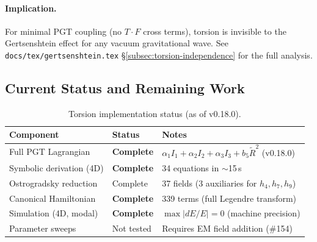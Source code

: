 \paragraph{Implication.}
For minimal PGT coupling (no $T{\cdot}F$ cross terms), torsion is invisible to
the Gertsenshtein effect for any vacuum gravitational wave.  See
\texttt{docs/tex/gertsenshtein.tex} \S\ref{subsec:torsion-independence} for the
full analysis.

\subsection{Current Status and Remaining Work}
\label{sec:torsion-status}

\begin{table}[htbp]
\centering
\caption{Torsion implementation status (as of v0.18.0).}
\label{tab:torsion-status}
\begin{tabular}{@{}llp{7cm}@{}}
\toprule
Component & Status & Notes \\
\midrule
Full PGT Lagrangian & \textbf{Complete} & $\alpha_1 I_1 + \alpha_2 I_2 + \alpha_3 I_3 + b_5 \tilde{R}^2$ (v0.18.0) \\
Symbolic derivation (4D) & \textbf{Complete} & 34 equations in $\sim$15\,s \\
Ostrogradsky reduction & Complete & 37 fields (3 auxiliaries for $h_4, h_7, h_9$) \\
Canonical Hamiltonian & \textbf{Complete} & 339 terms (full Legendre transform) \\
Simulation (4D, modal) & \textbf{Complete} & $\max|dE/E| = 0$ (machine precision) \\
Parameter sweeps & Not tested & Requires EM field addition (\#154) \\
\bottomrule
\end{tabular}
\end{table}

